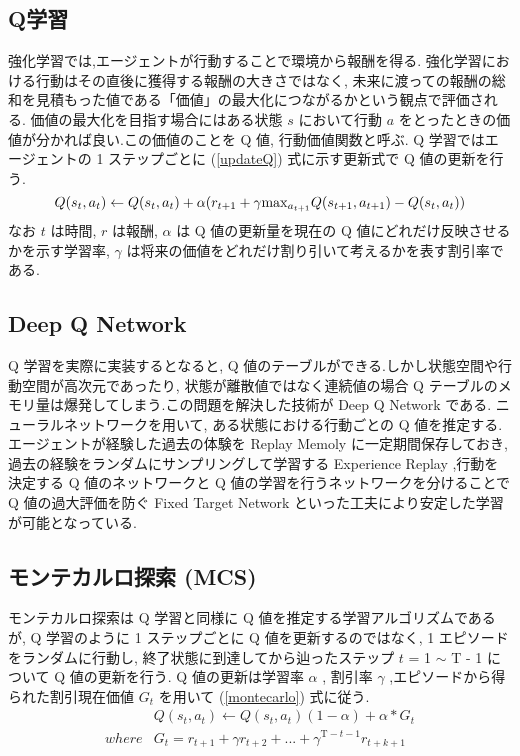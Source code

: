 \documentclass[twocolumn]{jarticle}     %
\begin{document}
\subsection{Q学習}
強化学習では,エージェントが行動することで環境から報酬を得る. 強化学習における行動はその直後に獲得する報酬の大きさではなく, 未来に渡っての報酬の総和を見積もった値である「価値」の最大化につながるかという観点で評価される.
価値の最大化を目指す場合にはある状態 $s$ において行動 $a$ をとったときの価値が分かれば良い.この価値のことを Q 値, 行動価値関数と呼ぶ.
 Q 学習ではエージェントの 1 ステップごとに (\ref{updateQ}) 式に示す更新式で Q 値の更新を行う.
\begin{equation}
  \small
  \label{updateQ}
  Q(s_t,a_t) \leftarrow  Q(s_t,a_t) + \alpha(r_{t+1} + \gamma \mathrm{max}_{a_{t+1}}Q(s_{t+1},a_{t+1}) - Q(s_t,a_t))
\end{equation}
なお $t$ は時間, $r$ は報酬, $\alpha$ は Q 値の更新量を現在の Q 値にどれだけ反映させるかを示す学習率, $\gamma$ は将来の価値をどれだけ割り引いて考えるかを表す割引率である.

\subsection{Deep Q Network}
Q 学習を実際に実装するとなると, Q 値のテーブルができる.しかし状態空間や行動空間が高次元であったり, 状態が離散値ではなく連続値の場合 Q テーブルのメモリ量は爆発してしまう.この問題を解決した技術が Deep Q Network である.
ニューラルネットワークを用いて, ある状態における行動ごとの Q 値を推定する.エージェントが経験した過去の体験を Replay Memoly に一定期間保存しておき, 過去の経験をランダムにサンプリングして学習する Experience Replay ,行動を決定する Q 値のネットワークと Q 値の学習を行うネットワークを分けることで Q 値の過大評価を防ぐ Fixed Target Network といった工夫により安定した学習が可能となっている\cite{DQN}.

\subsection{モンテカルロ探索 (MCS)}
モンテカルロ探索は Q 学習と同様に Q 値を推定する学習アルゴリズムであるが, Q 学習のように 1 ステップごとに Q 値を更新するのではなく, 1 エピソードをランダムに行動し, 終了状態に到達してから辿ったステップ $t$ = 1 $\sim$ T - 1 について Q 値の更新を行う. Q 値の更新は学習率 $\alpha$ , 割引率 $\gamma$ ,エピソードから得られた割引現在価値 $G_t$ を用いて (\ref{montecarlo}) 式に従う.
\begin{eqnarray}
  \label{montecarlo}
  &Q(s_t,a_t) \leftarrow Q(s_t,a_t)(1 - \alpha) + \alpha * G_{t} \\
  where  &G_t = r_{t+1} + \gamma r_{t+2} + ... + \gamma^{\mathrm{T}-t-1} r_{t+k+1} \nonumber
\end{eqnarray}
\end{document}
